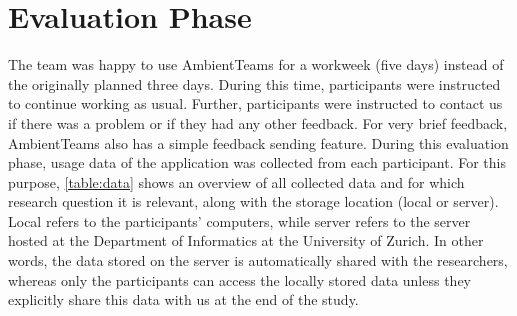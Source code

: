 \section{Evaluation Phase}
\label{section:evaluation}
The team was happy to use AmbientTeams for a workweek (five days) instead of the originally planned three days. During this time, participants were instructed to continue working as usual. Further, participants were instructed to contact us if there was a problem or if they had any other feedback. For very brief feedback, AmbientTeams also has a simple feedback sending feature. During this evaluation phase, usage data of the application was collected from each participant. For this purpose, \autoref{table:data} shows an overview of all collected data and for which research question it is relevant, along with the storage location (local or server). Local refers to the participants' computers, while server refers to the server hosted at the Department of Informatics at the University of Zurich. In other words, the data stored on the server is automatically shared with the researchers, whereas only the participants can access the locally stored data unless they explicitly share this data with us at the end of the study.

